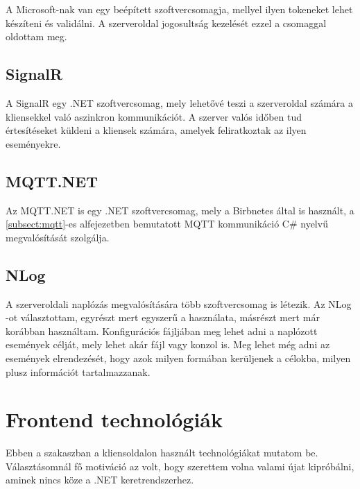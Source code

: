 A Microsoft-nak van egy beépített szoftvercsomagja, mellyel ilyen tokeneket lehet készíteni és validálni.
A szerveroldal jogosultság kezelését ezzel a csomaggal oldottam meg.

\subsection{SignalR}
A SignalR \cite{signalr} egy .NET szoftvercsomag, mely lehetővé teszi a szerveroldal számára a kliensekkel való aszinkron kommunikációt.
A szerver valós időben tud értesítéseket küldeni a kliensek számára, amelyek feliratkoztak az ilyen eseményekre.

\subsection{MQTT.NET}
Az MQTT.NET \cite{mqttnet-github} is egy .NET szoftvercsomag, mely a Birbnetes által is használt, a \ref{subsect:mqtt}-es alfejezetben bemutatott MQTT kommunikáció C\# nyelvű megvalósítását szolgálja.

\subsection{NLog}
A szerveroldali naplózás megvalósítására több szoftvercsomag is létezik. Az NLog \cite{nlog}-ot választottam, egyrészt mert egyszerű a használata,
másrészt mert már korábban használtam. Konfigurációs fájljában meg lehet adni a naplózott események célját, mely lehet akár fájl vagy konzol is.
Meg lehet még adni az események elrendezését, hogy azok milyen formában kerüljenek a célokba, milyen plusz információt tartalmazzanak.

\section{Frontend technológiák}
Ebben a szakaszban a kliensoldalon használt technológiákat mutatom be. 
Választásomnál fő motiváció az volt, hogy szerettem volna valami újat kipróbálni, aminek nincs köze a .NET keretrendszerhez.

